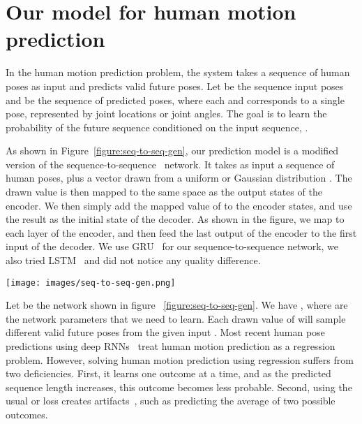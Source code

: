 \documentclass[10pt,twocolumn,letterpaper]{article}
\begin{document}
\section{Our model for human motion prediction}

In the human motion prediction problem, the system takes a sequence of human poses as input and predicts valid future poses. Let  be the sequence input poses and  be the sequence of predicted poses, where each  and  corresponds to a single pose, represented by joint locations or joint angles. The goal is to learn the probability of the future sequence conditioned on the input sequence, .

As shown in Figure~\ref{figure:seq-to-seq-gen}, our prediction model is a modified version of the sequence-to-sequence~\cite{nips2014:Ilya} network. It takes as input a sequence of human poses, plus a  vector drawn from a uniform or Gaussian distribution . The drawn  value is then mapped to the same space as the output states of the encoder. We then simply add the mapped value of  to the encoder states, and use the result as the initial state of the decoder. As shown in the figure, we map  to each layer of the encoder, and then feed the last output of the encoder to the first input of the decoder. We use GRU~\cite{corr2014:Chung} for our sequence-to-sequence network, we also tried LSTM~\cite{nc1997:Hochreiter} and did not notice any quality difference.

\begin{figure*}[ht]
\centering
\texttt{[image: images/seq-to-seq-gen.png]}
\caption{Sequence-to-sequence generator network. It predicts multiple future sequences from the same input by feeding in different  values.}
\label{figure:seq-to-seq-gen}
\end{figure*}

Let  be the network shown in figure ~\ref{figure:seq-to-seq-gen}. We have , where  are the network parameters that we need to learn. Each drawn value of  will sample different valid future poses from the given input . Most recent human pose predictions using deep RNNs~\cite{iccv2015:Katerina, cvpr2017:julieta} treat human motion prediction as a regression problem. However, solving human motion prediction using regression suffers from two deficiencies. First, it learns one outcome at a time, and as the predicted sequence length increases, this outcome becomes less probable. Second, using the usual  or  loss creates artifacts~\cite{corr2015:Mathieu}, such as predicting the average of two possible outcomes.
\end{document}
